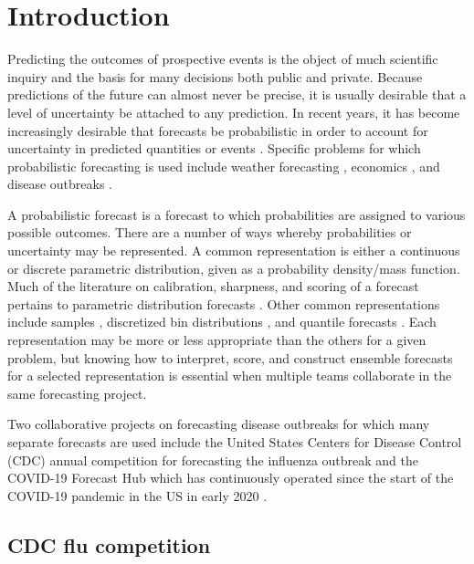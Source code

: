 \documentclass[11pt,notitlepage]{isuthesis}
\begin{document}
\chapter{Introduction}

Predicting the outcomes of prospective events is the object of much scientific
inquiry and the basis for many decisions both public and private. Because 
predictions of the future can almost never be precise, it is usually desirable
that a level of uncertainty be attached to any prediction. In recent years, it
has become increasingly desirable that forecasts be probabilistic in order to 
account for uncertainty in predicted quantities or events 
\cite[]{gneiting2014probabilistic}. Specific problems for 
which probabilistic forecasting is used include weather forecasting
\cite[]{baran2018combining}, economics \cite[]{groen2013real}, and disease outbreaks
\cite[]{yamana2016superensemble}.

A probabilistic forecast is a forecast to which probabilities are assigned to 
various possible outcomes. There are a number of ways whereby probabilities or 
uncertainty may be represented. A common representation is either a continuous 
or
discrete parametric distribution, given as a probability density/mass function. 
Much of the literature 
on calibration, sharpness, and scoring of a forecast pertains to parametric 
distribution forecasts
\cite[]{gneiting2007probabilistic,gneiting2013combining,baran2018combining}.
Other common representations include samples \cite[]{krueger2016probabilistic}, 
discretized bin distributions \cite[]{mcgowan2019collaborative},
and quantile forecasts \cite[]{taylor2021evaluating, bracher2021evaluating}. 
Each representation may be more or less 
appropriate than the others for a given problem, but knowing how to interpret, 
score, and construct ensemble forecasts for a selected representation is 
essential when multiple teams collaborate in the same forecasting project.


Two collaborative projects on forecasting disease outbreaks for which many 
separate forecasts 
are used include the United States Centers for Disease Control (CDC)
annual competition for forecasting the influenza outbreak \cite[]{cdcflusight}
and the COVID-19 Forecast Hub which has 
continuously operated since the start of the COVID-19 pandemic in the US in 
early 2020 \cite[]{Cramer2021-hub-dataset}.

\section{CDC flu competition}
\end{document}
